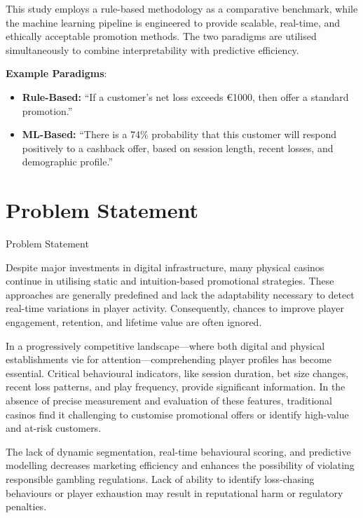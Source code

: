 \documentclass[12pt,a4paper]{report}
\begin{document}
 This study employs a rule-based methodology as a comparative benchmark, while the machine learning pipeline is engineered to provide scalable, real-time, and ethically acceptable promotion methods.  The two paradigms are utilised simultaneously to combine interpretability with predictive efficiency.

\vspace{0.2cm}
\textbf{Example Paradigms}:
\begin{itemize}
    \item \textbf{Rule-Based:} ``If a customer’s net loss exceeds €1000, then offer a standard promotion.''
    \item \textbf{ML-Based:} ``There is a 74\% probability that this customer will respond positively to a cashback offer, based on session length, recent losses, and demographic profile.''
\end{itemize}


\section{Problem Statement}

Problem Statement

 Despite major investments in digital infrastructure, many physical casinos continue in utilising static and intuition-based promotional strategies.  These approaches are generally predefined and lack the adaptability necessary to detect real-time variations in player activity.  Consequently, chances to improve player engagement, retention, and lifetime value are often ignored.

 In a progressively competitive landscape—where both digital and physical establishments vie for attention—comprehending player profiles has become essential.  Critical behavioural indicators, like session duration, bet size changes, recent loss patterns, and play frequency, provide significant information.  In the absence of precise measurement and evaluation of these features, traditional casinos find it challenging to customise promotional offers or identify high-value and at-risk customers.

 The lack of dynamic segmentation, real-time behavioural scoring, and predictive modelling decreases marketing efficiency and enhances the possibility of violating responsible gambling regulations.  Lack of ability to identify loss-chasing behaviours or player exhaustion may result in reputational harm or regulatory penalties.
\end{document}
